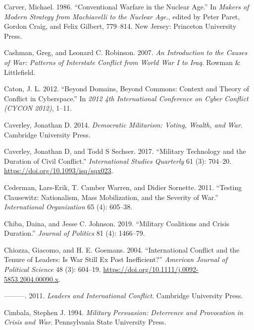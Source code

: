 \documentclass[
]{article}
\begin{document}
\leavevmode\hypertarget{ref-carver_conventionalwarfarenuclear_1986}{}%
Carver, Michael. 1986. ``Conventional Warfare in the Nuclear Age.'' In \emph{Makers of Modern Strategy from Machiavelli to the Nuclear Age.}, edited by Peter Paret, Gordon Craig, and Felix Gilbert, 779--814. New Jersey: Princeton University Press.

\leavevmode\hypertarget{ref-cashman_introductioncauseswar_2007}{}%
Cashman, Greg, and Leonard C. Robinson. 2007. \emph{An Introduction to the Causes of War: Patterns of Interstate Conflict from World War I to Iraq}. Rowman \& Littlefield.

\leavevmode\hypertarget{ref-caton_domainscommonscontext_2012}{}%
Caton, J. L. 2012. ``Beyond Domains, Beyond Commons: Context and Theory of Conflict in Cyberspace.'' In \emph{2012 4th International Conference on Cyber Conflict (CYCON 2012)}, 1--11.

\leavevmode\hypertarget{ref-caverley_democraticmilitarismvoting_2014}{}%
Caverley, Jonathan D. 2014. \emph{Democratic Militarism: Voting, Wealth, and War}. Cambridge University Press.

\leavevmode\hypertarget{ref-caverley_militarytechnologyduration_2017}{}%
Caverley, Jonathan D, and Todd S Sechser. 2017. ``Military Technology and the Duration of Civil Conflict.'' \emph{International Studies Quarterly} 61 (3): 704--20. \url{https://doi.org/10.1093/isq/sqx023}.

\leavevmode\hypertarget{ref-cederman_testingclausewitznationalism_2011}{}%
Cederman, Lars-Erik, T. Camber Warren, and Didier Sornette. 2011. ``Testing Clausewitz: Nationalism, Mass Mobilization, and the Severity of War.'' \emph{International Organization} 65 (4): 605--38.

\leavevmode\hypertarget{ref-chiba_militarycoalitionscrisis_2019}{}%
Chiba, Daina, and Jesse C. Johnson. 2019. ``Military Coalitions and Crisis Duration.'' \emph{Journal of Politics} 81 (4): 1466--79.

\leavevmode\hypertarget{ref-chiozza_internationalconflicttenure_2004}{}%
Chiozza, Giacomo, and H. E. Goemans. 2004. ``International Conflict and the Tenure of Leaders: Is War Still Ex Post Inefficient?'' \emph{American Journal of Political Science} 48 (3): 604--19. \url{https://doi.org/10.1111/j.0092-5853.2004.00090.x}.

\leavevmode\hypertarget{ref-chiozza_leadersinternationalconflict_2011}{}%
---------. 2011. \emph{Leaders and International Conflict}. Cambridge University Press.

\leavevmode\hypertarget{ref-cimbala_militarypersuasiondeterrence_1994}{}%
Cimbala, Stephen J. 1994. \emph{Military Persuasion: Deterrence and Provocation in Crisis and War}. Pennsylvania State University Press.
\end{document}
